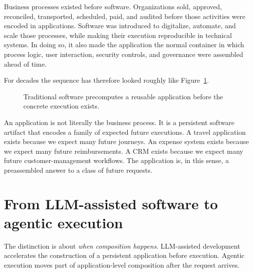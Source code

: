 \documentclass[10pt,oneside,openany]{book}
\begin{document}
Business processes existed before software. Organizations sold, approved, reconciled, transported, scheduled, paid, and audited before those activities were encoded in applications. Software was introduced to digitalize, automate, and scale those processes, while making their execution reproducible in technical systems. In doing so, it also made the application the normal container in which process logic, user interaction, security controls, and governance were assembled ahead of time.

For decades the sequence has therefore looked roughly like Figure~\ref{fig:traditional-sequence}.

\begin{figure}[!htbp]
\centering
{}
\caption{Traditional software precomputes a reusable application before the concrete execution exists.}
\label{fig:traditional-sequence}
\end{figure}

An application is not literally the business process. It is a persistent software artifact that encodes a family of expected future executions. A travel application exists because we expect many future journeys. An expense system exists because we expect many future reimbursements. A CRM exists because we expect many future customer-management workflows. The application is, in this sense, a preassembled answer to a class of future requests.

\section{From LLM-assisted software to agentic execution}\label{sec:agentic}

The distinction is about \emph{when composition happens}. LLM-assisted development accelerates the construction of a persistent application before execution. Agentic execution moves part of application-level composition after the request arrives.
\end{document}
